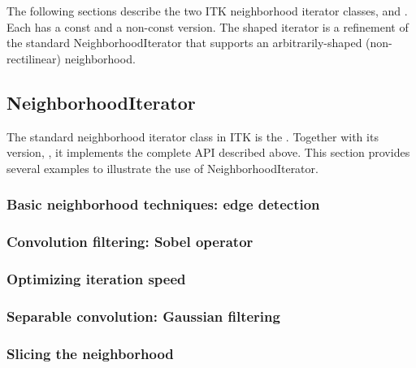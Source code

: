 {The following sections describe the two ITK neighborhood iterator classes,
 and .
Each has a const and a non-const version.  The shaped iterator is a refinement
of the standard NeighborhoodIterator that supports an
arbitrarily-shaped (non-rectilinear) neighborhood.

\subsection{NeighborhoodIterator}
\label{sec:itkNeighborhoodIterator}

The standard neighborhood iterator class in ITK is the
.  Together with its  version,
, it implements the complete API
described above.  This section provides several examples to illustrate the use
of NeighborhoodIterator.

\subsubsection{Basic neighborhood techniques: edge detection}
\label{sec:NeighborhoodExample1}


\subsubsection{Convolution filtering: Sobel operator}
\label{sec:NeighborhoodExample2}


\subsubsection{Optimizing iteration speed}
\label{sec:NeighborhoodExample3}


\subsubsection{Separable convolution: Gaussian filtering}
\label{sec:NeighborhoodExample4}


\subsubsection{Slicing the neighborhood}
\label{sec:NeighborhoodExample5}


}
